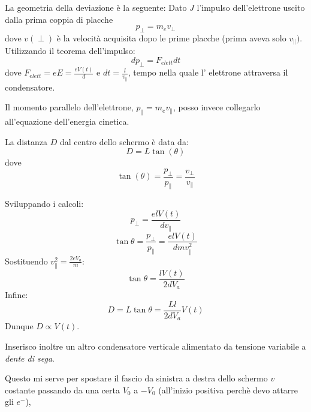 \documentclass{article}
\begin{document}
\pagebreak
La geometria della deviazione è la seguente:
Dato $J$ l'impulso dell'elettrone uscito dalla prima coppia di placche
\[
p_\perp=m_ev_\perp
\]
dove $v(\perp)$ è la velocità acquisita dopo le prime placche (prima aveva solo $v_\parallel)$.
Utilizzando il teorema dell'impulso:
\[ dp_{\perp} = F_{elett} dt \]
dove $F_{elett} = eE= \frac{e V(t)}{d}$ e $dt = \frac{l}{v_{\parallel}}$, tempo nella quale l' elettrone attraversa il condensatore. 

Il momento parallelo dell'elettrone, $p_{\parallel} = m_e v_{\parallel}$, posso invece collegarlo all'equazione dell'energia cinetica. 


La distanza $D$ dal centro dello schermo è data da:
\[ D = L \tan(\theta) \] 
dove 
\[ \tan(\theta) = \frac{p_{\perp}}{p_{\parallel}} = \frac{v_\perp}{v_\parallel} \]



Sviluppando i calcoli:
\[
p_{\perp} = \frac{e l V(t)}{d v_{\parallel}}
\]
\[
\tan\theta = \frac{p_{\perp}}{p_{\parallel}} = \frac{e l V(t)}{d m v_{\parallel}^2}
\]
Sostituendo $v_{\parallel}^2 = \frac{2eV_a}{m}$:
\[
\tan\theta = \frac{l V(t)}{2d V_a}
\]
Infine:
\[
D = L \tan\theta = \frac{L l}{2d V_a} V(t)
\]
Dunque $D \propto V(t)$.

Inserisco inoltre un altro condensatore verticale alimentato da tensione variabile a \textit{dente di sega}. 
\begin{center}
\end{center}
Questo mi serve per spostare il fascio da sinistra a destra dello schermo $v$ costante 
passando da una certa $V_0$ a $-V_0$ (all'inizio positiva perchè devo attarre gli $e^-$),
\end{document}
